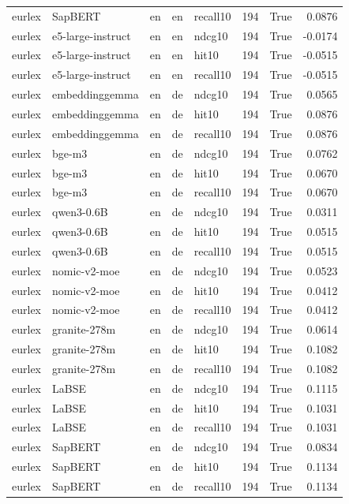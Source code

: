 \begin{tabular}{lllllrrr}
eurlex & SapBERT & en & en & recall10 & 194 & True & 0.0876 \\
eurlex & e5-large-instruct & en & en & ndcg10 & 194 & True & -0.0174 \\
eurlex & e5-large-instruct & en & en & hit10 & 194 & True & -0.0515 \\
eurlex & e5-large-instruct & en & en & recall10 & 194 & True & -0.0515 \\
eurlex & embeddinggemma & en & de & ndcg10 & 194 & True & 0.0565 \\
eurlex & embeddinggemma & en & de & hit10 & 194 & True & 0.0876 \\
eurlex & embeddinggemma & en & de & recall10 & 194 & True & 0.0876 \\
eurlex & bge-m3 & en & de & ndcg10 & 194 & True & 0.0762 \\
eurlex & bge-m3 & en & de & hit10 & 194 & True & 0.0670 \\
eurlex & bge-m3 & en & de & recall10 & 194 & True & 0.0670 \\
eurlex & qwen3-0.6B & en & de & ndcg10 & 194 & True & 0.0311 \\
eurlex & qwen3-0.6B & en & de & hit10 & 194 & True & 0.0515 \\
eurlex & qwen3-0.6B & en & de & recall10 & 194 & True & 0.0515 \\
eurlex & nomic-v2-moe & en & de & ndcg10 & 194 & True & 0.0523 \\
eurlex & nomic-v2-moe & en & de & hit10 & 194 & True & 0.0412 \\
eurlex & nomic-v2-moe & en & de & recall10 & 194 & True & 0.0412 \\
eurlex & granite-278m & en & de & ndcg10 & 194 & True & 0.0614 \\
eurlex & granite-278m & en & de & hit10 & 194 & True & 0.1082 \\
eurlex & granite-278m & en & de & recall10 & 194 & True & 0.1082 \\
eurlex & LaBSE & en & de & ndcg10 & 194 & True & 0.1115 \\
eurlex & LaBSE & en & de & hit10 & 194 & True & 0.1031 \\
eurlex & LaBSE & en & de & recall10 & 194 & True & 0.1031 \\
eurlex & SapBERT & en & de & ndcg10 & 194 & True & 0.0834 \\
eurlex & SapBERT & en & de & hit10 & 194 & True & 0.1134 \\
eurlex & SapBERT & en & de & recall10 & 194 & True & 0.1134 \\

\end{tabular}
